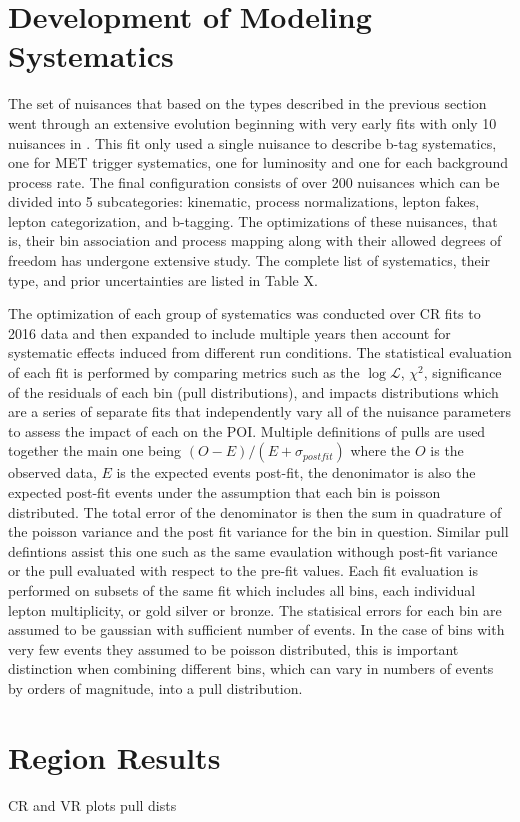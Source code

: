 \section{Development of Modeling Systematics}
The set of nuisances that based on the types described in the previous section went through an extensive evolution beginning with very early fits with only 10 nuisances in \cite{erich thesis}. This fit only used a single nuisance to describe b-tag systematics, one for MET trigger systematics, one for luminosity and one for each background process rate. The final configuration consists of over 200 nuisances which can be divided into 5 subcategories: kinematic, process normalizations, lepton fakes, lepton categorization, and b-tagging. The optimizations of these nuisances, that is, their bin association and process mapping along with their allowed degrees of freedom has undergone extensive study. The complete list of systematics, their type, and prior uncertainties are listed in Table X.


The optimization of each group of systematics was conducted over CR fits to 2016 data and then expanded to include multiple years then account for systematic effects induced from different run conditions. The statistical evaluation of each fit is performed by comparing metrics such as the $\log\mathcal{L}$, $\chi^2$, significance of the residuals of each bin (pull distributions), and impacts distributions which are a series of separate fits that independently vary all of the nuisance parameters to assess the impact of each on the POI. Multiple definitions of pulls are used together the main one being $ (O-E)/(E+\sigma_{postfit})$ where the $O$ is the observed data, $E$ is the expected events post-fit, the denonimator is also the expected post-fit events under the assumption that each bin is poisson distributed. The total error of the denominator is then the sum in quadrature of the poisson variance and the post fit variance for the bin in question. Similar pull defintions assist this one such as the same evaulation withough post-fit variance or the pull evaluated with respect to the pre-fit values. Each fit evaluation is performed on subsets of the same fit which includes all bins, each individual lepton multiplicity, or gold silver or bronze. The statisical errors for each bin are assumed to be gaussian with sufficient number of events. In the case of bins with very few events they assumed to be poisson distributed, this is important distinction when combining different bins, which can vary in numbers of events by orders of magnitude, into a pull distribution.
 

\section{Region Results}

CR and VR plots 
pull dists

